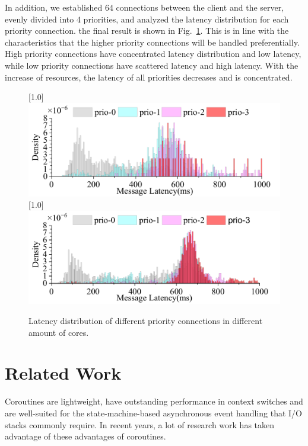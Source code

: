 \documentclass[sigconf,review,anonymous]{acmart}
\begin{document}
In addition, we established 64 connections between the client and the server, evenly divided into 4 priorities, and analyzed the latency distribution for each priority connection. the final result is shown in Fig.~\ref{fig:prio-cores}. This is in line with the characteristics that the higher priority connections will be handled preferentially. High priority connections have concentrated latency distribution and low latency, while low priority connections have scattered latency and high latency. With the increase of resources, the latency of all priorities decreases and is concentrated.

\begin{figure}[ht]
    \centering
    [1.0\linewidth]
    {
    \includegraphics[width=\linewidth]{assets/prio-core2.pdf}
    }
    [1.0\linewidth]
    {
    \includegraphics[width=\linewidth]{assets/prio-core4.pdf}
    }
    \caption{Latency distribution of different priority connections in different amount of cores.}
    \label{fig:prio-cores}
\end{figure}

\section{Related Work}

Coroutines are lightweight, have outstanding performance in context switches and are well-suited for the state-machine-based asynchronous event handling that I/O stacks commonly require. In recent years, a lot of research work has taken advantage of these advantages of coroutines.
\end{document}
